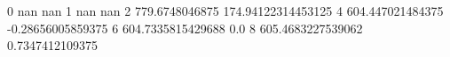 0 nan nan
1 nan nan
2 779.6748046875 174.94122314453125
4 604.447021484375 -0.28656005859375
6 604.7335815429688 0.0
8 605.4683227539062 0.7347412109375
